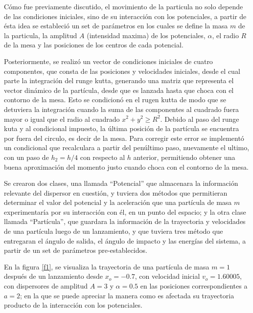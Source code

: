 \documentclass[11pt,letterpaper,twocolumn]{article}
\begin{document}
\par 
Cómo fue previamente discutido, el movimiento de la particula no solo depende de las condiciones iniciales, sino de su interacción con los potenciales, a partir de ésta idea se estableció un set de parámetros en los cuales se define la masa $m$ de la particula, la amplitud $A$ (intensidad maxima) de los potenciales, $\alpha$, el radio $R$ de la mesa y las posiciones de los centros de cada potencial.\\
\par 
Posteriormente, se realizó un vector de condiciones iniciales de cuatro componentes, que consta de las posiciones y velocidades iniciales, desde el cual parte la integración del runge kutta, generando una matriz que representa el vector dinámico de la partícula, desde que es lanzada hasta que choca con el contorno de la mesa. Esto se condicionó en el rugen kutta de modo que se detuviera la integración cuando la suma de las componentes al cuadrado fuera mayor o igual que el radio al cuadrado $x^{2} + y^{2} \geq R^{2}$. Debido al paso del runge kuta y al condicional impuesto, la última posición de la partícula se encuentra por fuera del circulo, es decir de la mesa. Para corregir este error se implementó un condicional que recalculara a partir del penúltimo paso, nuevamente el ultimo, con un paso de $h_{2}=h/4$ con respecto al $h$ anterior, permitiendo obtener una buena aproximación del momento justo cuando choca con el contorno de la mesa.\\
\par
Se crearon dos clases, una llamada “Potencial” que almacenara la información relevante del dispersor en cuestión, y tuviera dos métodos que permitieran determinar el valor del potencial y la aceleración que una partícula de masa $m$ experimentaría por su interacción con él, en un punto del espacio; y la otra clase llamada “Partícula”, que guardara la información de la trayectoria y velocidades de una partícula luego de un lanzamiento, y que tuviera tres método que entregaran el ángulo de salida, el ángulo de impacto y las energías del sistema, a partir de un set de parámetros pre-establecidos.\\ 
\par 
En la figura \ref{f1}, se visualiza la trayectoria de una partícula de masa $m=1$ después de un lanzamiento desde $x_{o}=-0.7$, con velocidad inicial $v_{o}=1.60005$, con dispersores de amplitud $A=3$ y $\alpha=0.5$ en las posiciones correspondientes a $a=2$; en la que se puede apreciar la manera como es afectada su trayectoria producto de la interacción con los potenciales.\\ 
\end{document}
